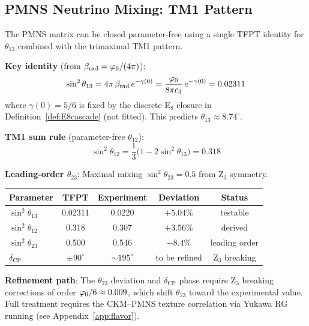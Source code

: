 \subsection{PMNS Neutrino Mixing: TM1 Pattern}

\begin{tcolorbox}[colback=blue!3, colframe=blue!50!black, 
    title={\textbf{PMNS Closure via $\beta_{\text{rad}}$ Identities}}, fonttitle=\bfseries]
The PMNS matrix can be closed parameter-free using a single TFPT identity for $\theta_{13}$
combined with the trimaximal TM1 pattern.

\textbf{Key identity} (from $\beta_{\text{rad}} = \varphi_0/(4\pi)$):
\begin{equation}
    \sin^2\theta_{13} = 4\pi\,\beta_{\text{rad}}\, e^{-\gamma(0)} 
    = \frac{\varphi_0}{8\pi c_3}\, e^{-\gamma(0)} = 0.02311
\end{equation}
where $\gamma(0)=5/6$ is fixed by the discrete E$_8$ closure in Definition~\ref{def:E8cascade} (not fitted). 
This predicts $\theta_{13} \approx 8.74^\circ$.

\textbf{TM1 sum rule} (parameter-free $\theta_{12}$):
\begin{equation}
    \sin^2\theta_{12} = \frac{1}{3}\bigl(1 - 2\sin^2\theta_{13}\bigr) = 0.318
\end{equation}

\textbf{Leading-order $\theta_{23}$}: Maximal mixing $\sin^2\theta_{23} = 0.5$ from Z$_3$ symmetry.

\begin{center}
\begin{tabular}{@{}lcccc@{}}
\toprule
\textbf{Parameter} & \textbf{TFPT} & \textbf{Experiment} & \textbf{Deviation} & \textbf{Status}\\
\midrule
$\sin^2\theta_{13}$ & 0.02311 & 0.0220 & $+5.04\%$ & testable\\
$\sin^2\theta_{12}$ & 0.318 & 0.307 & $+3.56\%$ & derived\\
$\sin^2\theta_{23}$ & 0.500 & 0.546 & $-8.4\%$ & leading order\\
$\delta_{\text{CP}}$ & $\pm 90^\circ$ & $\sim 195^\circ$ & to be refined & Z$_3$ breaking\\
\bottomrule
\end{tabular}
\end{center}

\textbf{Refinement path}: The $\theta_{23}$ deviation and $\delta_{\text{CP}}$ phase require 
Z$_3$ breaking corrections of order $\varphi_0/6 \approx 0.009$, which shift $\theta_{23}$ toward 
the experimental value. Full treatment requires the CKM--PMNS texture correlation via 
Yukawa RG running (see Appendix~\ref{app:flavor}).
\end{tcolorbox}

